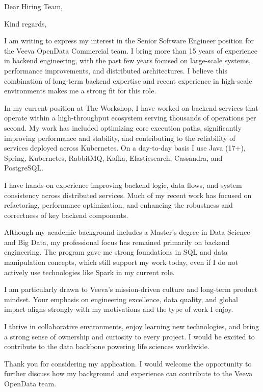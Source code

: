 \documentclass[11pt,a4paper,sans]{moderncv}
\begin{document}
\date{December 3rd, 2025}
\subject{Software Engineer - OpenData (Remote)}
\opening{Dear Hiring Team,}
\closing{Kind regards,}

\makelettertitle

\begin{justify}
I am writing to express my interest in the Senior Software Engineer position for the Veeva OpenData Commercial team. I bring more than 15 years of experience in backend engineering, with the past few years focused on large-scale systems, performance improvements, and distributed architectures. I believe this combination of long-term backend expertise and recent experience in high-scale environments makes me a strong fit for this role.

In my current position at The Workshop, I have worked on backend services that operate within a high-throughput ecosystem serving thousands of operations per second. My work has included optimizing core execution paths, significantly improving performance and stability, and contributing to the reliability of services deployed across Kubernetes. On a day-to-day basis I use Java (17+), Spring, Kubernetes, RabbitMQ, Kafka, Elasticsearch, Cassandra, and PostgreSQL.

I have hands-on experience improving backend logic, data flows, and system consistency across distributed services. Much of my recent work has focused on refactoring, performance optimization, and enhancing the robustness and correctness of key backend components.

Although my academic background includes a Master's degree in Data Science and Big Data, my professional focus has remained primarily on backend engineering. The program gave me strong foundations in SQL and data manipulation concepts, which still support my work today, even if I do not actively use technologies like Spark in my current role.

I am particularly drawn to Veeva's mission-driven culture and long-term product mindset. Your emphasis on engineering excellence, data quality, and global impact aligns strongly with my motivations and the type of work I enjoy.

I thrive in collaborative environments, enjoy learning new technologies, and bring a strong sense of ownership and curiosity to every project. I would be excited to contribute to the data backbone powering life sciences worldwide.

Thank you for considering my application. I would welcome the opportunity to further discuss how my background and experience can contribute to the Veeva OpenData team.
\end{justify}

\makeletterclosing
\end{document}
